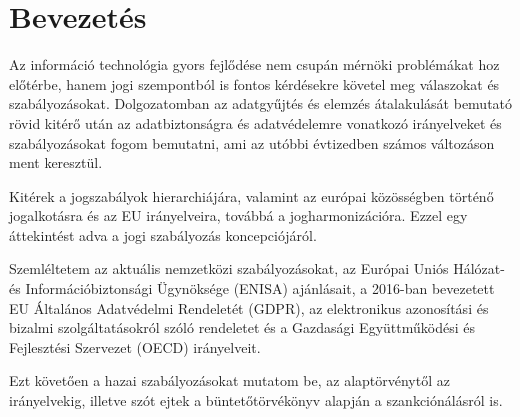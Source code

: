 \chapter{Bevezetés}

Az információ technológia gyors fejlődése nem csupán mérnöki problémákat hoz előtérbe, hanem jogi szempontból is fontos kérdésekre követel meg válaszokat és szabályozásokat. Dolgozatomban az adatgyűjtés és elemzés átalakulását bemutató rövid kitérő után az adatbiztonságra és adatvédelemre vonatkozó irányelveket és szabályozásokat fogom bemutatni, ami az utóbbi évtizedben számos változáson ment keresztül.

Kitérek a jogszabályok hierarchiájára, valamint az európai közösségben történő jogalkotásra és az EU irányelveira, továbbá a jogharmonizációra. Ezzel egy áttekintést adva a jogi szabályozás koncepciójáról.

Szemléltetem az aktuális nemzetközi szabályozásokat, az Európai Uniós Hálózat- és Információbiztonsági Ügynöksége (ENISA) ajánlásait, a 2016-ban bevezetett EU Általános Adatvédelmi Rendeletét (GDPR), az elektronikus azonosítási és bizalmi szolgáltatásokról szóló rendeletet és a Gazdasági Együttműködési és Fejlesztési Szervezet (OECD) irányelveit.

Ezt követően a hazai szabályozásokat mutatom be, az alaptörvénytől az irányelvekig, illetve szót ejtek a büntetőtörvékönyv alapján a szankciónálásról is.